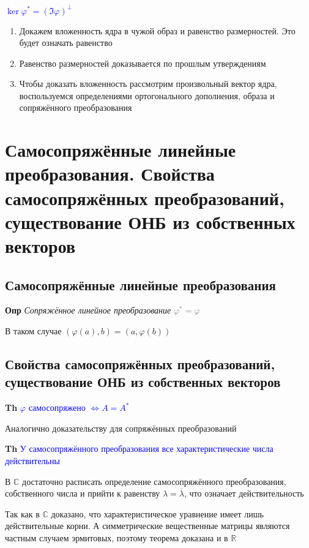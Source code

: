 \documentclass[a4paper, 14pt]{article}
\begin{document}
    \textcolor{blue}{$\ker \varphi^* = (\Im \varphi)^\bot$}
    
    \begin{enumerate}
        \item Докажем вложенность ядра в чужой образ и равенство размерностей.
        Это будет означать равенство
        \item Равенство размерностей доказывается по прошлым утверждениям
        \item Чтобы доказать вложенность рассмотрим произвольный вектор ядра, воспользуемся определениями
        ортогонального дополнения, образа и сопряжённого преобразования
    \end{enumerate}
    
    \section{Самосопряжённые линейные преобразования.
    Свойства самосопряжённых преобразований, существование ОНБ из собственных векторов}
    
    \subsection{Самосопряжённые линейные преобразования}
    
    \textbf{Опр} \textit{Сопряжённое линейное преобразование} \textcolor{gray}{$\varphi^* = \varphi$}
    
    В таком случае $(\varphi (a), b) = (a, \varphi(b))$
    
    \subsection{Свойства самосопряжённых преобразований, существование ОНБ из собственных векторов}
    
    \textbf{Th} \textcolor{blue}{$\varphi$ самосопряжено $\Leftrightarrow A = A^*$}
    
    Аналогично доказательству для сопряжённых преобразований
    
    \textbf{Th} \textcolor{blue}{У самосопряжённого преобразования все характеристические числа действительны}
    
    В $\mathbb{C}$ достаточно расписать определение самосопряжённого преобразования, собственного числа и прийти к
    равенству $\lambda = \overline{\lambda}$, что означает действительность
    
    Так как в $\mathbb{C}$ доказано, что характеристическое уравнение имеет лишь действительные корни.
    А симметрические вещественные матрицы являются частным случаем эрмитовых, поэтому теорема доказана и в $\mathbb{R}$
    
\end{document}

